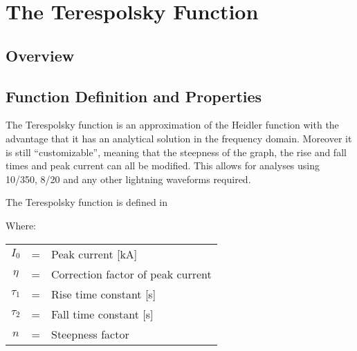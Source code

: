 
\chapter{The Terespolsky Function} %

\label{ChapterTeres} %

\begin{quote}
\end{quote}

\section{Overview}


\section{Function Definition and Properties}
The Terespolsky function is an approximation of the Heidler function with the advantage that it has an analytical solution in the frequency domain. Moreover it is still ``customizable'', meaning that the steepness of the graph, the rise and fall times and peak current can all be modified. This allows for analyses using 10/350, 8/20 and any other lightning waveforms required.

The Terespolsky function is defined in 

Where: \\
\begin{tabular}{cll}
	$I_0$ & = & Peak current [kA] \\
	$\eta$ & = & Correction factor of peak current \\
	$\tau_1$ & = & Rise time constant [s] \\
	$\tau_2$ & = & Fall time constant [s] \\
	$n$ & = & Steepness factor
\end{tabular}\\

